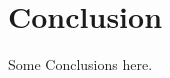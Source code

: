 \documentclass[autowc]{CUP-JNL-PPS}
\begin{document}
\theendnotes

\section{Conclusion}

Some Conclusions here.



\begin{Backmatter}



\end{Backmatter}
\end{document}
